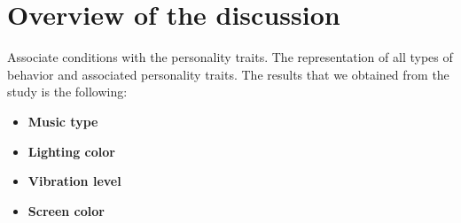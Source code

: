 \section{Overview of the discussion}
\label{sec:overview-of-the-discussion}

Associate conditions with the personality traits.
The representation of all types of behavior and associated personality traits.
The results that we obtained from the study is the following:

\begin{itemize}
    \renewcommand{\labelitemi}{$\Rightarrow$}
    \item \textbf{Music type}

    \item \textbf{Lighting color}

    \item \textbf{Vibration level}

    \item \textbf{Screen color}
\end{itemize}